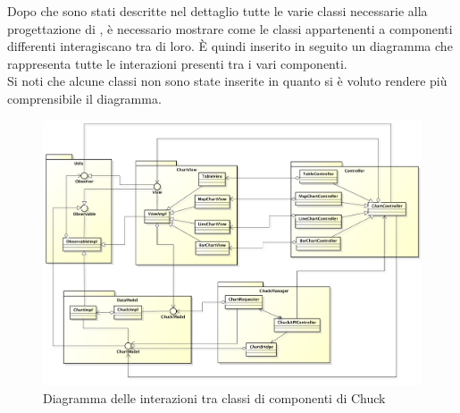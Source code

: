 	Dopo che sono stati descritte nel dettaglio tutte le varie classi necessarie alla progettazione di , è necessario mostrare come le classi appartenenti a componenti differenti interagiscano tra di loro. È quindi inserito in seguito un diagramma  che rappresenta tutte le interazioni presenti tra i vari componenti.\\
	Si noti che alcune classi non sono state inserite in quanto si è voluto rendere più comprensibile il diagramma.

	\begin{figure}[H]\centering
		\includegraphics[width=\textwidth]{SpecificaTecnica/Pics/InterazioniComponentiChuck.pdf}
		\caption{Diagramma delle interazioni tra classi di componenti di Chuck}
	\end{figure}